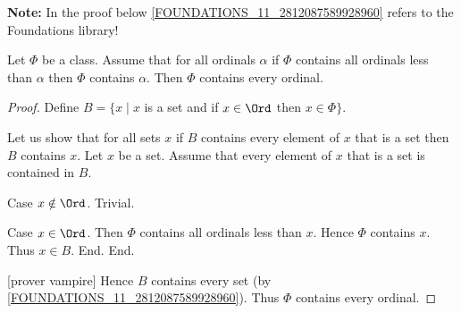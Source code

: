 \documentclass[../../set-theory/set-theory.tex]{subfiles}
\begin{document}
  \noindent \textbf{Note:} In the proof below
  \ref{FOUNDATIONS_11_2812087589928960} refers to the Foundations library!

  \begin{forthel}
    \begin{theorem}
      Let $\Phi$ be a class.
      Assume that for all ordinals $\alpha$ if $\Phi$ contains all ordinals
      less than $\alpha$ then $\Phi$ contains $\alpha$.
      Then $\Phi$ contains every ordinal.
    \end{theorem}
    \begin{proof}
      Define $B = \{ x \mid x$ is a set and if $x \in \Ord$ then
      $x \in \Phi \}$.

      Let us show that for all sets $x$ if $B$ contains every element of $x$
      that is a set then $B$ contains $x$.
        Let $x$ be a set.
        Assume that every element of $x$ that is a set is contained in $B$.

        Case $x \notin \Ord$. Trivial.

        Case $x \in \Ord$.
          Then $\Phi$ contains all ordinals less than $x$.
          Hence $\Phi$ contains $x$.
          Thus $x \in B$.
        End.
      End.

      [prover vampire]
      Hence $B$ contains every set (by \ref{FOUNDATIONS_11_2812087589928960}).
      Thus $\Phi$ contains every ordinal.
    \end{proof}
  \end{forthel}
\end{document}
